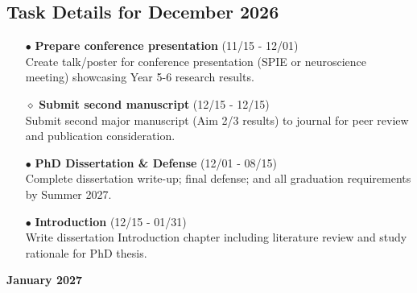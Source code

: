 \documentclass[landscape,a4paper]{article}
\begin{document}
\vspace{0.5cm}
\subsection{Task Details for December 2026}
\begin{itemize}[leftmargin=1cm]
    \item[\textcolor{researchout}{$\bullet$}] \textbf{Prepare conference presentation} (11/15 - 12/01)\\ Create talk/poster for conference presentation (SPIE or neuroscience meeting) showcasing Year 5-6 research results.
    \item[\textcolor{researchout}{$\diamond$}] \textbf{Submit second manuscript} (12/15 - 12/15)\\ Submit second major manuscript (Aim 2/3 results) to journal for peer review and publication consideration.
    \item[\textcolor{other}{$\bullet$}] \textbf{PhD Dissertation \& Defense} (12/01 - 08/15)\\ Complete dissertation write-up; final defense; and all graduation requirements by Summer 2027.
    \item[\textcolor{other}{$\bullet$}] \textbf{Introduction} (12/15 - 01/31)\\ Write dissertation Introduction chapter including literature review and study rationale for PhD thesis.
\end{itemize}

\newpage
\pagestyle{empty}

\begin{center}
{\large\textbf{January 2027}}
\end{center}
\end{document}
